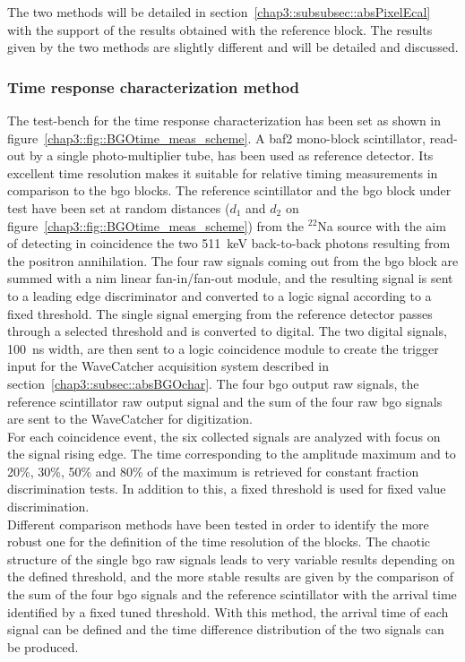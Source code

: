 The two methods will be detailed in section~\ref{chap3::subsubsec::absPixelEcal} with the support of the results obtained with the reference block. The results given by the two methods are slightly different and will be detailed and discussed.

\subsubsection{Time response characterization method}\label{chap3::subsubsec::absTimeMethod}

The test-bench for the time response characterization has been set as shown in figure~\ref{chap3::fig::BGOtime_meas_scheme}. A \gls{baf2} mono-block scintillator, read-out by a single photo-multiplier tube, has been used as reference detector. Its excellent time resolution makes it suitable for relative timing measurements in comparison to the \gls{bgo} blocks. The reference scintillator and the \gls{bgo} block under test have been set at random distances ($d_1$ and $d_2$ on figure~\ref{chap3::fig::BGOtime_meas_scheme}) from the $^{22}$Na source with the aim of detecting in coincidence the two 511~keV back-to-back photons resulting from the positron annihilation. The four raw signals coming out from the \gls{bgo} block are summed with a \gls{nim} linear fan-in/fan-out module, and the resulting signal is sent to a leading edge discriminator and converted to a logic signal according to a fixed threshold. The single signal emerging from the reference detector passes through a selected threshold and is converted to digital. The two digital signals, 100~ns width, are then sent to a logic coincidence module to create the trigger input for the WaveCatcher acquisition system described in section~\ref{chap3::subsec::absBGOchar}. The four \gls{bgo} output raw signals, the reference scintillator raw output signal and the sum of the four raw \gls{bgo} signals are sent to the WaveCatcher for digitization.\\
For each coincidence event, the six collected signals are analyzed with focus on the signal rising edge. The time corresponding to the amplitude maximum and to 20\%, 30\%, 50\% and 80\% of the maximum is retrieved for constant fraction discrimination tests. In addition to this, a fixed threshold is used for fixed value discrimination.\\
Different comparison methods have been tested in order to identify the more robust one for the definition of the time resolution of the blocks. The chaotic structure of the single \gls{bgo} raw signals leads to very variable results depending on the defined threshold, and the more stable results are given by the comparison of the sum of the four \gls{bgo} signals and the reference scintillator with the arrival time identified by a fixed tuned threshold. With this method, the arrival time of each signal can be defined and the time difference distribution of the two signals can be produced.\\
